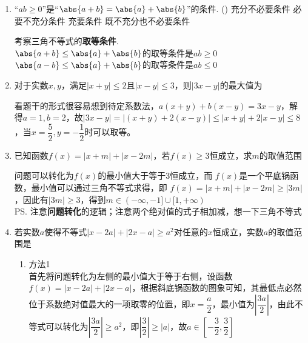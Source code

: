 \begin{enumerate}
\begin{enumerate}
        \begin{jieda}
            $ab > 0$，则$|a+b| = |a| + |b| > |a|$，因此正确，错误. \\
            $ab > 0$，则$|a+b| = |a| + |b| > |a-b|$，因此正确，错误. \\
            和则直接应用三角不等式可以判断.
        \end{jieda}
        \item ``$ab\geq 0$''是``$\abs{a+b}=\abs{a}+\abs{b}$''的\blk 条件. \dotfill()
        \xx
        {充分不必要条件}
        {必要不充分条件}
        {充要条件}
        {既不充分也不必要条件}
        \begin{jieda}
        考察三角不等式的\textbf{取等条件}. \\
        $\abs{a+b} \leq \abs{a}+\abs{b}$的取等条件是$ab\geq 0$ \\
        $\abs{a-b} \leq \abs{a}+\abs{b}$的取等条件是$ab\leq 0$
        \end{jieda}
        \item 对于实数$x,y$，满足$|x+y| \leq 2$且$|x-y| \leq 3$，则$|3x-y|$的最大值为
        \begin{jieda}
            看题干的形式很容易想到待定系数法，$a(x+y) + b(x-y) = 3x-y$，解得$a = 1, b = 2$，故$|3x-y| = |(x+y) + 2(x-y)| \leq |x+y| + 2|x-y| \leq 8$，当$x = \dfrac{5}{2}, y = -\dfrac{1}{2}$时可以取等。
        \end{jieda}
        \item 已知函数$f(x) = |x+m| + |x-2m|$，若$f(x) \geq 3$恒成立，求$m$的取值范围
        \begin{jieda}
            问题可以转化为$f(x)$的最小值大于等于3恒成立，而 $f(x)$是一个平底锅函数，最小值可以通过三角不等式求得，即 $f(x) = |x+m| + |x-2m| \geq |3m|$，因此有$|3m| \geq 3$，得到$m \in (-\infty, -1] \cup [1, +\infty)$ \\
            \ps 注意\textbf{问题转化}的逻辑；注意两个绝对值的式子相加减，想一下三角不等式
        \end{jieda}
        \item 若实数$a$使得不等式$|x-2a| + |2x-a| \geq a^2$对任意的$x$恒成立，实数$a$的取值范围是
        \begin{jieda}
            \begin{enumerate}
            \item 方法1 \\
            首先将问题转化为左侧的最小值大于等于右侧，设函数$f(x) = |x-2a| + |2x-a|$，根据斜底锅函数的图象可知，其最低点必然位于系数绝对值最大的一项取零的位置，即$x = \dfrac{a}{2}$，最小值为$\left|\dfrac{3a}{2}\right|$，由此不等式可以转化为$\left|\dfrac{3a}{2}\right| \geq a^2$，即$\left |\dfrac{3}{2} \right| \geq |a|$，故$a \in \left[-\dfrac{3}{2}, \dfrac{3}{2}\right]$

\end{enumerate}
\end{jieda}
\end{enumerate}
\end{enumerate}
